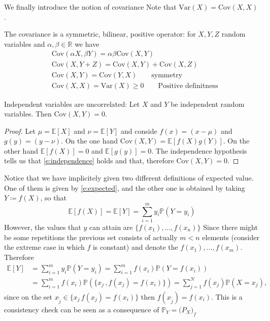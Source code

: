 	We finally introduce the notion of covariance 
	Note that $\text{Var}(X) = \text{Cov}(X,X)$. 
	\begin{proposition}
		\label{p:bilinearity}
		The covariance is a symmetric, bilinear, positive operator: for $X, Y, Z$ random variables and $\alpha,\beta \in \mathbb R$ we have 
		\begin{equation}
			\label{e:bil}
			\begin{split}
		& 	\text{Cov}(\alpha X,\beta Y) = \alpha \beta \text{Cov}(X,Y )\\
		&	\text{Cov}(X, Y + Z) = \text{Cov}(X, Y )  + \text{Cov}(X,Z)\\
		& 	\text{Cov}(X,Y ) = \text{Cov}(Y, X) \qquad \text{symmetry }\\
		&	\text{Cov}(X,X ) = \text{Var}(X) \geq 0 \qquad \text{Positive definitness}
		\end{split}
		\end{equation}
	\end{proposition}
	\begin{theorem}
		\label{t:uncorrelated}
		Independent variables are uncorrelated: Let $X$ and $Y$ be independent random variables. Then $\text{Cov}(X,Y) = 0$. 
	\end{theorem}
	\begin{proof}
	 Let $\mu = \mathbb E[X]$ and $\nu = \mathbb E[Y ]$ and conside $f(x) = (x- \mu)$ and $g(y)  = (y - \nu)$. On the one hand $\text{Cov}(X, Y ) = \mathbb E[f(X)g(Y)]$. On the other hand $\mathbb E[f(X)] = 0$ and $\mathbb E[g(y)] = 0$. The independence hypothesis tells us that \eqref{e:independence} holds and that, therefore $\text{Cov}(X,Y ) = 0$. 
	\end{proof}

	\begin{remark}
		Notice that we have implicitely given two different definitions of expected value. One of them is given by \eqref{e:expected}, and the other one is obtained by taking $Y\coloneqq f(X)$, so that 
		\begin{equation}
			\mathbb E[ f(X)] = \mathbb E[Y] = \sum_{i = 1}^m y_i \mathbb P( Y = y_i)
		\end{equation} 
	However, the values that $y$ can attain are $\{f(x_1),\ldots, f(x_n)\}$ Since there might be some repetitions the previous set consists of actually $m<n$ elements (consider the extreme case in which $f$ is constant) and denote the $f(x_1),\ldots, f(x_m)$. Therefore  
		\begin{equation}
		\begin{split}
			\mathbb E[Y ] & = \sum_{i = 1}^m y_i \mathbb P( Y = y_i ) = \sum_{i = 1}^m f(x_i) \mathbb P( Y = f(x_i)) \\
				& = \sum_{i = 1 }^m f(x_i) \mathbb P(\{x_j \, , f(x_j) = f(x_i)\}) = \sum_{j = 1}^N f(x_j)\mathbb P( X = x_j),
		\end{split}
		\end{equation} 
	since on the set $x_{\tilde j} \in\{x_j\, f(x_j) = f(x_i) \}$ then $f(x_{\tilde j } ) = f(x_i)$.
This is a consistency check can be seen as a consequence of $\mathbb P_Y = \mathbb (P_X)_f$

	\end{remark}

